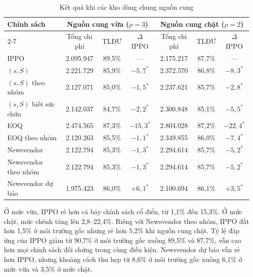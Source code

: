 \begin{table}[H]
    \centering
    \caption{Kết quả khi các kho dùng chung nguồn cung}
    \label{tab:nguonCung}
    \small
    \setlength{\tabcolsep}{3pt}
    \begin{tabular}{|l|c|c|c|c|c|c|}
        \hline
        \multirow{2}{*}{Chính sách} &
        \multicolumn{3}{c|}{Nguồn cung vừa ($\rho = 3$)} &
        \multicolumn{3}{c|}{Nguồn cung chặt ($\rho = 2$)} \\
        \cline{2-7}
        & Tổng chi phí & TLĐƯ & $\Delta$ IPPO & Tổng chi phí & TLĐƯ & $\Delta$ IPPO \\
        \hline
        IPPO                   & 2.095.947 & 89,5\% & ---           & 2.175.217 & 87,7\% & --- \\ \hline
        $(s,S)$                & 2.221.729 & 85,9\% & $-5{,}7^{*}$  & 2.372.570 & 86,8\% & $-8{,}3^{*}$ \\ \hline
        $(s,S)$ theo nhóm      & 2.127.071 & 85,0\% & $-1{,}5^{*}$  & 2.237.621 & 85,7\% & $-2{,}8^{*}$ \\ \hline
        $(s,S)$ biết sức chứa  & 2.142.037 & 84,7\% & $-2{,}2^{*}$  & 2.300.848 & 85,1\% & $-5{,}5^{*}$ \\ \hline
        EOQ                    & 2.474.565 & 87,3\% & $-15{,}3^{*}$ & 2.804.028 & 87,2\% & $-22{,}4^{*}$ \\ \hline
        EOQ theo nhóm          & 2.120.263 & 85,5\% & $-1{,}1^{*}$  & 2.349.855 & 86,0\% & $-7{,}4^{*}$ \\ \hline
        Newsvendor             & 2.122.794 & 85,3\% & $-1{,}3^{*}$  & 2.294.614 & 85,7\% & $-5{,}2^{*}$ \\ \hline
        Newsvendor theo nhóm   & 2.122.794 & 85,3\% & $-1{,}3^{*}$  & 2.294.614 & 85,7\% & $-5{,}2^{*}$ \\ \hline
        Newsvendor dự báo      & 1.975.423 & 86,0\% & $+6{,}1^{*}$  & 2.100.694 & 86,1\% & $+3{,}5^{*}$ \\
        \hline
    \end{tabular}
\end{table}

Ở mức vừa, IPPO rẻ hơn cả bảy chính sách cổ điển, từ 1,1\% đến 15,3\%. Ở mức chặt, mức chênh tăng lên 2,8--22,4\%. Riêng với Newsvendor theo nhóm, IPPO đắt hơn 1,5\% ở môi trường gốc nhưng rẻ hơn 5,2\% khi nguồn cung chặt. Tỷ lệ đáp ứng của IPPO giảm từ 90,7\% ở môi trường gốc xuống 89,5\% và 87,7\%, vẫn cao hơn mọi chính sách đối chứng trong cùng điều kiện. Newsvendor dự báo vẫn rẻ hơn IPPO, nhưng khoảng cách thu hẹp từ 8,6\% ở môi trường gốc xuống 6,1\% ở mức vừa và 3,5\% ở mức chặt.

